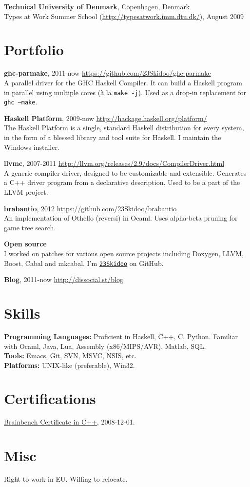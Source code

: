 \documentclass[margin,line]{res}
\begin{document}
\begin{resume}
{\bf Technical University of Denmark}, Copenhagen, Denmark\\
Types at Work Summer School (\url{http://typesatwork.imm.dtu.dk/}), August 2009

\section{\sc Portfolio}

{\bf ghc-parmake}, 2011-now \hfill \url{https://github.com/23Skidoo/ghc-parmake}\\
A parallel driver for the GHC Haskell Compiler. It can build a Haskell
program in parallel using multiple cores (à la \texttt{make -j}). Used as a
drop-in replacement for \texttt{ghc --make}.

{\bf Haskell Platform}, 2009-now \hfill \url{http://hackage.haskell.org/platform/}\\
The Haskell Platform is a single, standard Haskell distribution for every
system, in the form of a blessed library and tool suite for Haskell. I maintain
the Windows installer.

{\bf llvmc}, 2007-2011 \hfill \url{http://llvm.org/releases/2.9/docs/CompilerDriver.html}\\
A generic compiler driver, designed to be customizable and extensible. Generates
a C++ driver program from a declarative description. Used to be a part of the
LLVM project.

{\bf brabantio}, 2012 \hfill \url{https://github.com/23Skidoo/brabantio}\\
An implementation of Othello (reversi) in Ocaml. Uses alpha-beta pruning for
game tree search.

{\bf Open source}\\ I worked on patches for various open source projects
including Doxygen, LLVM, Boost, Cabal and mkcabal. I'm
\href{https://github.com/23Skidoo/}{\texttt{23Skidoo}} on GitHub.

{\bf Blog}, 2011-now \hfill \url{http://dissocial.st/blog}

\section{\sc Skills}

{\bf Programming Languages:} Proficient in Haskell, C++, C, Python. Familiar
with Ocaml, Java, Lua, Assembly (x86/MIPS/AVR), Matlab, SQL. \\
{\bf Tools:} Emacs, Git, SVN, MSVC, NSIS, etc.\\
{\bf Platforms:} UNIX-like (preferable), Win32.

\section{\sc Certifications}

\href{http://www.brainbench.com/transcript.jsp?pid=5078355}
{Brainbench Certificate in C++}, 2008-12-01.

\section{\sc Misc}

Right to work in EU. Willing to relocate.

\end{resume}
\end{document}
